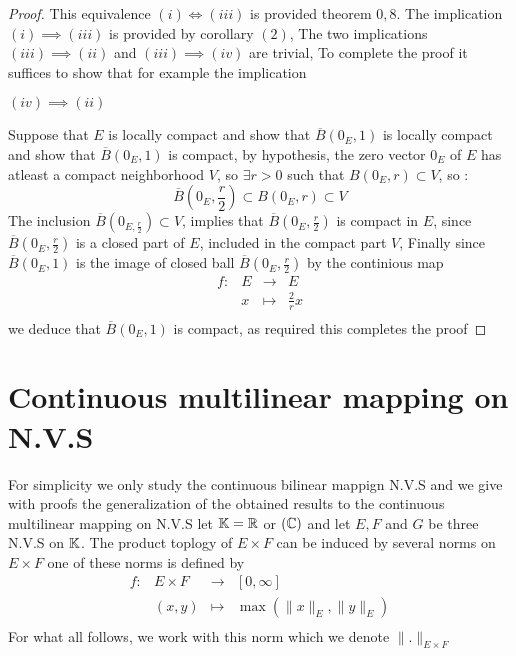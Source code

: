 \begin{proof}
This equivalence $(i) \iff (iii)   $ is provided theorem $0,8$. The implication 
	$(i) \implies (iii)$ is provided by corollary $(2)$, The two implications 
	$(iii) \implies (ii)   $ and $(iii) \implies (iv)  $ are trivial, To complete
	the proof it suffices to show that for example the implication
	\begin{center}
	$(iv)  \implies (ii)  $
	\end{center}
	Suppose that $E $ is locally compact and show that $\overline{B}(0_{E},1)$ is locally
	compact and show that $\overline{B}(0_{E},1)$ is compact, by hypothesis,
	the zero vector $0_{E}$ of $E $ has atleast a compact neighborhood $V $, so
	$\exists r > 0 $ such that $B(0_{E},r) \subset V  $, so : 
	\[
	\overline{B}(0_{E}, \frac{r}{2})  
	\subset B \left( 0_{E},r \right) \subset V
	\]
	The inclusion $\overline{B}(0_{E,\frac{r}{2}})  \subset V $, implies that 
	$\overline{B}(0_{E},\frac{r}{2})  $ is compact in $E $, since
	$\overline{B}(0_{E}, \frac{r}{2})$ is a closed
	part of $E $, included in the compact part $V$,  
	Finally since $\overline{B}(0_{E},1)$ is the image of closed
	ball $\overline{B}(0_{E},\frac{r}{2})$ by the continious map 
	\[
	\begin{array}{cccc}
	      f : & E   & \longrightarrow & E \\
	
	           &  x  & \longmapsto     &\frac{2}{r}x  \\ 
	\end{array}
	\]
	we deduce that $\overline{B}(0_{E},1)  $ is compact, as required this completes
	the proof
\end{proof}
\chapter{Continuous multilinear mapping on N.V.S}
For simplicity we only study the continuous bilinear mappign N.V.S and we give with proofs
the generalization of the obtained results to the continuous multilinear mapping on N.V.S 
let $\mathbb{K} = \mathbb{R}  $ or $(\mathbb{C} )  $ and let $E,F $ and $G $ be three N.V.S on $\mathbb{K} $. The product
toplogy of $E \times F  $ can be induced by several norms on $E \times F  $ one of these
norms is defined by 
\[
\begin{array}{cccc}
	f : &  E \times F   & \longrightarrow & [0,\infty ]  \\

           &   (x,y) & \longmapsto     &  \max \left( \| x \| _{E}, \| y \| _{E} \right) \\ 
\end{array}
\]
For what all follows, we work with this norm which we denote $ \| . \|_{E \times F }  $ 

